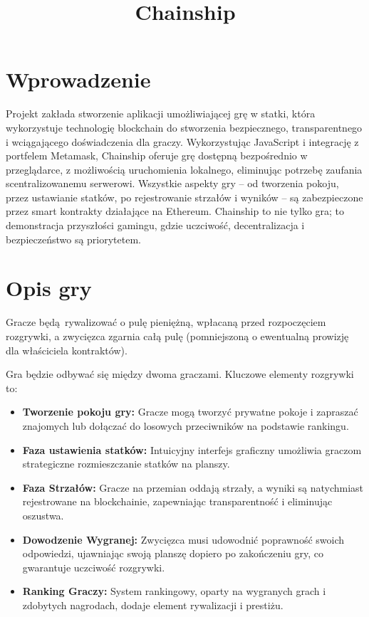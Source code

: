 \documentclass{article}
\title{Chainship}
\date{}
\begin{document}
\maketitle

\section{Wprowadzenie}

Projekt zakłada stworzenie aplikacji umożliwiającej grę w statki, która wykorzystuje technologię blockchain do stworzenia bezpiecznego, transparentnego i wciągającego doświadczenia dla graczy. Wykorzystując JavaScript i integrację z portfelem Metamask, Chainship oferuje grę dostępną bezpośrednio w przeglądarce, z możliwością uruchomienia lokalnego, eliminując potrzebę zaufania scentralizowanemu serwerowi. Wszystkie aspekty gry – od tworzenia pokoju, przez ustawianie statków, po rejestrowanie strzałów i wyników – są zabezpieczone przez smart kontrakty działające na Ethereum. Chainship to nie tylko gra; to demonstracja przyszłości gamingu, gdzie uczciwość, decentralizacja i bezpieczeństwo są priorytetem.

\section{Opis gry}

Gracze będą rywalizować o pulę pieniężną, wpłacaną przed rozpoczęciem rozgrywki, a zwycięzca zgarnia całą pulę (pomniejszoną o ewentualną prowizję dla właściciela kontraktów).

Gra będzie odbywać się między dwoma graczami. Kluczowe elementy rozgrywki to:
\begin{itemize}
    \item \textbf{Tworzenie pokoju gry:} Gracze mogą tworzyć prywatne pokoje i zapraszać znajomych lub dołączać do losowych przeciwników na podstawie rankingu.
    \item \textbf{Faza ustawienia statków:} Intuicyjny interfejs graficzny umożliwia graczom strategiczne rozmieszczanie statków na planszy.
    \item \textbf{Faza Strzałów:} Gracze na przemian oddają strzały, a wyniki są natychmiast rejestrowane na blockchainie, zapewniając transparentność i eliminując oszustwa.
    \item \textbf{Dowodzenie Wygranej:} Zwycięzca musi udowodnić poprawność swoich odpowiedzi, ujawniając swoją planszę dopiero po zakończeniu gry, co gwarantuje uczciwość rozgrywki.
    \item \textbf{Ranking Graczy:} System rankingowy, oparty na wygranych grach i zdobytych nagrodach, dodaje element rywalizacji i prestiżu.
\end{itemize}
\end{document}
